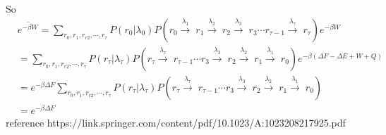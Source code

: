 \documentclass{article}
\begin{document}
So
\begin{equation}
    \begin{split}
&\overline{e^{-\beta W}}=\sum_{r_{0},r_{1},r_{r2},\cdots,r_{\tau}}P(r_0|\lambda_{0})P(r_{0}\xrightarrow{\lambda_{1}}\;r_{1}\xrightarrow{\lambda_{2}}\;r_{2}\xrightarrow{\lambda_{3}}\;r_{3}\cdots r_{\tau -1}\xrightarrow{\lambda_{\tau}}\;r_{\tau})e^{-\beta W}\\
&=\sum_{r_{0},r_{1},r_{r2},\cdots,r_{\tau}}P(r_{\tau}|\lambda_{\tau})P(r_{\tau}\xrightarrow{\lambda_{\tau}}\;r_{\tau-1}\cdots r_{3}\xrightarrow{\lambda_{3}}\;r_{2}\xrightarrow{\lambda_{2}}\;r_{1}\xrightarrow{\lambda_{1}}\;r_{0})e^{-\beta(\Delta F-\Delta E +W+Q)}\\
&=e^{-\beta \Delta F}\sum_{r_{0},r_{1},r_{r2},\cdots,r_{\tau}}P(r_{\tau}|\lambda_{\tau})P(r_{\tau}\xrightarrow{\lambda_{\tau}}\;r_{\tau-1}\cdots r_{3}\xrightarrow{\lambda_{3}}\;r_{2}\xrightarrow{\lambda_{2}}\;r_{1}\xrightarrow{\lambda_{1}}\;r_{0})\\
&=e^{-\beta \Delta F}
    \end{split}
\end{equation}
reference https://link.springer.com/content/pdf/10.1023/A:1023208217925.pdf
\end{document}
